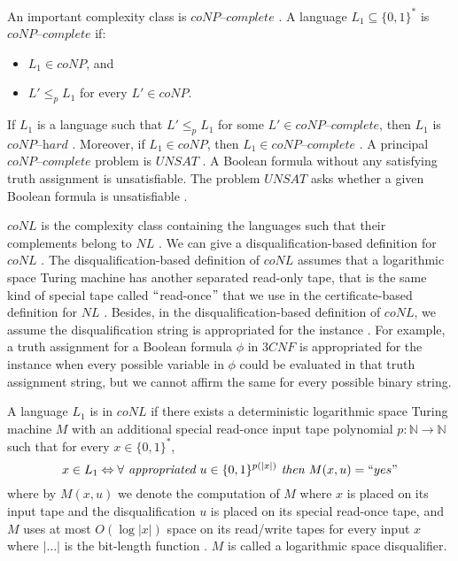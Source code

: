 \documentclass[a4paper,UKenglish,cleveref, autoref]{lipics-v2019}
\begin{document}
An important complexity class is $\textit{coNP--complete}$ \cite{GJ79}. A language $L_{1} \subseteq \{0, 1\}^{*}$ is $\textit{coNP--complete}$ if:

\begin{itemize}
\item $L_{1} \in coNP$, and
\item $L' \leq_{p} L_{1}$ for every $L' \in coNP$.
\end{itemize}

If $L_{1}$ is a language such that $L' \leq_{p} L_{1}$ for some $L' \in \textit{coNP--complete}$, then $L_{1}$ is $\textit{coNP--hard}$ \cite{CLRS01}. Moreover, if $L_{1} \in coNP$, then $L_{1} \in \textit{coNP--complete}$ \cite{CLRS01}. A principal $\textit{coNP--complete}$ problem is $UNSAT$ \cite{GJ79}. A Boolean formula without any satisfying truth assignment is unsatisfiable. The problem $UNSAT$ asks whether a given Boolean formula is unsatisfiable \cite{GJ79}.

$coNL$ is the complexity class containing the languages such that their complements belong to $NL$ \cite{Pap03}. We can give a disqualification-based definition for $coNL$ \cite{AB09}. The disqualification-based definition of $coNL$ assumes that a logarithmic space Turing machine has another separated read-only tape, that is the same kind of special tape called $``$read-once$"$ that we use in the certificate-based definition for $NL$ \cite{AB09}. Besides, in the disqualification-based definition of $coNL$, we assume the disqualification string is appropriated for the instance \cite{Pap03}. For example, a truth assignment for a Boolean formula $\phi$ in $3CNF$ is appropriated for the instance when every possible variable in $\phi$ could be evaluated in that truth assignment string, but we cannot affirm the same for every possible binary string.

\begin{definition}
A language $L_{1}$ is in $coNL$ if there exists a deterministic logarithmic space Turing machine $M$ with an additional special read-once input tape polynomial $p: \mathbb{N} \rightarrow \mathbb{N}$ such that for every $x \in \{0, 1\}^{*}$,
\[x \in L_{1} \Leftrightarrow \forall \textit{ appropriated } u \in \{0, 1\}^{p(|x|)} \textit{ then } M(x, u) = ``yes" \]
where by $M(x, u)$ we denote the computation of $M$ where $x$ is placed on its input tape and the disqualification $u$ is placed on its special read-once tape, and $M$ uses at most $O(\log |x|)$ space on its read/write tapes for every input $x$ where $|\ldots|$ is the bit-length function \cite{AB09}. $M$ is called a logarithmic space disqualifier.
\end{definition}
\end{document}
